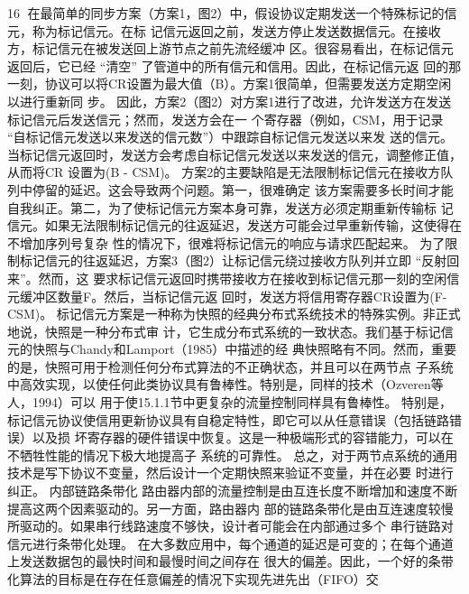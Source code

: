                                                       16
在最简单的同步方案（方案1，图2）中，假设协议定期发送一个特殊标记的信元，称为标记信元。在标
记信元返回之前，发送方停止发送数据信元。在接收方，标记信元在被发送回上游节点之前先流经缓冲
区。很容易看出，在标记信元返回后，它已经 “清空” 了管道中的所有信元和信用。因此，在标记信元返
回的那一刻，协议可以将CR设置为最大值（B）。方案1很简单，但需要发送方定期空闲以进行重新同
步。
因此，方案2（图2）对方案1进行了改进，允许发送方在发送标记信元后发送信元；然而，发送方会在一
个寄存器（例如，CSM，用于记录 “自标记信元发送以来发送的信元数”）中跟踪自标记信元发送以来发
送的信元。当标记信元返回时，发送方会考虑自标记信元发送以来发送的信元，调整修正值，从而将CR
设置为(B - CSM)。
方案2的主要缺陷是无法限制标记信元在接收方队列中停留的延迟。这会导致两个问题。第一，很难确定
该方案需要多长时间才能自我纠正。第二，为了使标记信元方案本身可靠，发送方必须定期重新传输标
记信元。如果无法限制标记信元的往返延迟，发送方可能会过早重新传输，这使得在不增加序列号复杂
性的情况下，很难将标记信元的响应与请求匹配起来。
为了限制标记信元的往返延迟，方案3（图2）让标记信元绕过接收方队列并立即 “反射回来”。然而，这
要求标记信元返回时携带接收方在接收到标记信元那一刻的空闲信元缓冲区数量F。然后，当标记信元返
回时，发送方将信用寄存器CR设置为(F-CSM)。
标记信元方案是一种称为快照的经典分布式系统技术的特殊实例。非正式地说，快照是一种分布式审
计，它生成分布式系统的一致状态。我们基于标记信元的快照与Chandy和Lamport（1985）中描述的经
典快照略有不同。然而，重要的是，快照可用于检测任何分布式算法的不正确状态，并且可以在两节点
子系统中高效实现，以使任何此类协议具有鲁棒性。特别是，同样的技术（Ozveren等人，1994）可以
用于使15.1.1节中更复杂的流量控制同样具有鲁棒性。
特别是，标记信元协议使信用更新协议具有自稳定特性，即它可以从任意错误（包括链路错误）以及损
坏寄存器的硬件错误中恢复。这是一种极端形式的容错能力，可以在不牺牲性能的情况下极大地提高子
系统的可靠性。
总之，对于两节点系统的通用技术是写下协议不变量，然后设计一个定期快照来验证不变量，并在必要
时进行纠正。
内部链路条带化
路由器内部的流量控制是由互连长度不断增加和速度不断提高这两个因素驱动的。另一方面，路由器内
部的链路条带化是由互连速度较慢所驱动的。如果串行线路速度不够快，设计者可能会在内部通过多个
串行链路对信元进行条带化处理。
在大多数应用中，每个通道的延迟是可变的；在每个通道上发送数据包的最快时间和最慢时间之间存在
很大的偏差。因此，一个好的条带化算法的目标是在存在任意偏差的情况下实现先进先出（FIFO）交

